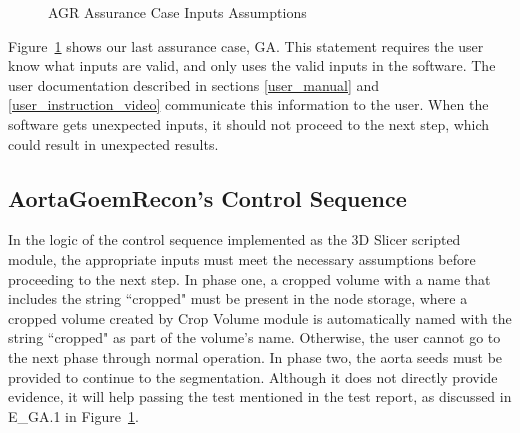 \begin{figure}[H]
    \centering
    \caption[AGR Assurance Case Inputs Assumptions]{AGR Assurance Case Inputs Assumptions}
    \label{fig_agr_ac_ga}
\end{figure}

Figure~\ref{fig_agr_ac_ga} shows our last assurance case, GA. This statement requires the user know what inputs are valid, and only uses the valid inputs in the software. The user documentation described in sections \ref{user_manual} and \ref{user_instruction_video} communicate this information to the user. When the software gets unexpected inputs, it should not proceed to the next step, which could result in unexpected results.

\subsection{AortaGoemRecon's Control Sequence}

In the logic of the control sequence implemented as the 3D Slicer scripted module, the appropriate inputs must meet the necessary assumptions before proceeding to the next step.
In phase one, a cropped volume with a name that includes the string ``cropped" must be present in the node storage, where a cropped volume created by Crop Volume module is automatically named with the string ``cropped" as part of the volume's name. Otherwise, the user cannot go to the next phase through normal operation. In phase two, the aorta seeds must be provided to continue to the segmentation. Although it does not directly provide evidence, it will help passing the test mentioned in the test report, as discussed in E\_GA.1 in Figure~\ref{fig_agr_ac_ga}.

